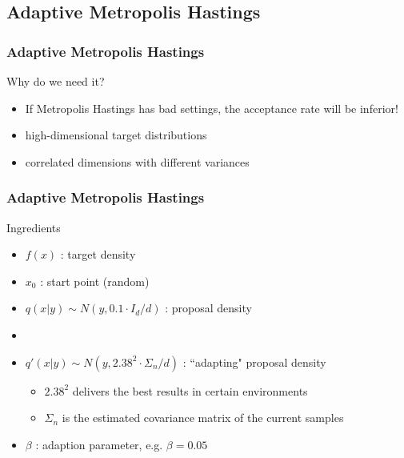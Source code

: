 
\subsection{Adaptive Metropolis Hastings}
\begin{frame}
\frametitle{Adaptive Metropolis Hastings}
\begin{block}{Why do we need it?}
\begin{itemize}
\item If Metropolis Hastings has bad settings, the acceptance rate will be
inferior!
\item high-dimensional target distributions
\item correlated dimensions with different variances
\end{itemize}
\end{block}

\end{frame}


\begin{frame}
\frametitle{Adaptive Metropolis Hastings}

\begin{block}{Ingredients}
\begin{itemize}
\item $f(x)$ : target density
\item $x_0$ : start point (random)
\item $q(x|y)\sim N(y, 0.1\cdot I_d / d)$ : proposal density
\item[]
\item $q'(x|y) \sim N(y, 2.38^2\cdot \Sigma_n /
d)$ : ``adapting" proposal density
\begin{itemize}
  \item $2.38^2$ delivers the best results in certain environments
  \item $\Sigma_n$ is the estimated covariance matrix of the current samples 
\end{itemize}
\item $\beta$ : adaption parameter, e.g. $\beta = 0.05$ 
\end{itemize}
\end{block}

\end{frame}




